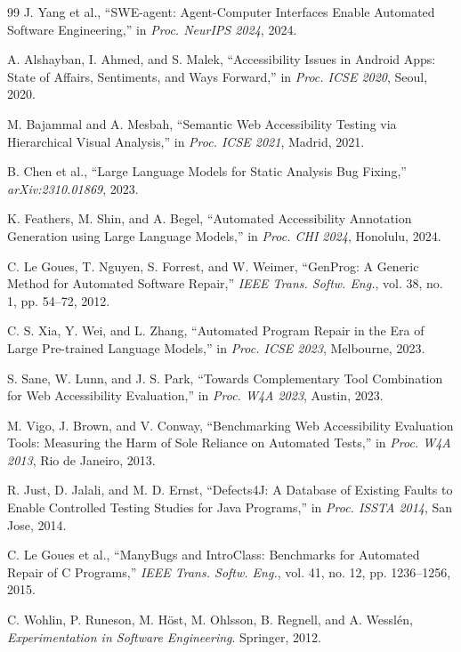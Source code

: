 \documentclass[10pt,conference]{IEEEtran}
\begin{document}
\begin{thebibliography}{99}
  J. Yang et al., ``SWE-agent: Agent-Computer Interfaces Enable Automated
  Software Engineering,'' in \textit{Proc. NeurIPS 2024}, 2024.

  A. Alshayban, I. Ahmed, and S. Malek, ``Accessibility Issues in Android
  Apps: State of Affairs, Sentiments, and Ways Forward,'' in \textit{Proc.
  ICSE 2020}, Seoul, 2020.

  M. Bajammal and A. Mesbah, ``Semantic Web Accessibility Testing via
  Hierarchical Visual Analysis,'' in \textit{Proc. ICSE 2021}, Madrid, 2021.

  B. Chen et al., ``Large Language Models for Static Analysis Bug Fixing,''
  \textit{arXiv:2310.01869}, 2023.

  K. Feathers, M. Shin, and A. Begel, ``Automated Accessibility Annotation
  Generation using Large Language Models,'' in \textit{Proc. CHI 2024},
  Honolulu, 2024.

  C. Le Goues, T. Nguyen, S. Forrest, and W. Weimer, ``GenProg: A Generic
  Method for Automated Software Repair,'' \textit{IEEE Trans. Softw. Eng.},
  vol. 38, no. 1, pp. 54--72, 2012.

  C. S. Xia, Y. Wei, and L. Zhang, ``Automated Program Repair in the Era of
  Large Pre-trained Language Models,'' in \textit{Proc. ICSE 2023},
  Melbourne, 2023.

  S. Sane, W. Lunn, and J. S. Park, ``Towards Complementary Tool Combination
  for Web Accessibility Evaluation,'' in \textit{Proc. W4A 2023},
  Austin, 2023.

  M. Vigo, J. Brown, and V. Conway, ``Benchmarking Web Accessibility
  Evaluation Tools: Measuring the Harm of Sole Reliance on Automated Tests,''
  in \textit{Proc. W4A 2013}, Rio de Janeiro, 2013.

  R. Just, D. Jalali, and M. D. Ernst, ``Defects4J: A Database of Existing
  Faults to Enable Controlled Testing Studies for Java Programs,'' in
  \textit{Proc. ISSTA 2014}, San Jose, 2014.

  C. Le Goues et al., ``ManyBugs and IntroClass: Benchmarks for Automated
  Repair of C Programs,'' \textit{IEEE Trans. Softw. Eng.}, vol. 41, no. 12,
  pp. 1236--1256, 2015.

  C. Wohlin, P. Runeson, M. Höst, M. Ohlsson, B. Regnell, and A. Wesslén,
  \textit{Experimentation in Software Engineering}. Springer, 2012.


\end{thebibliography}
\end{document}
